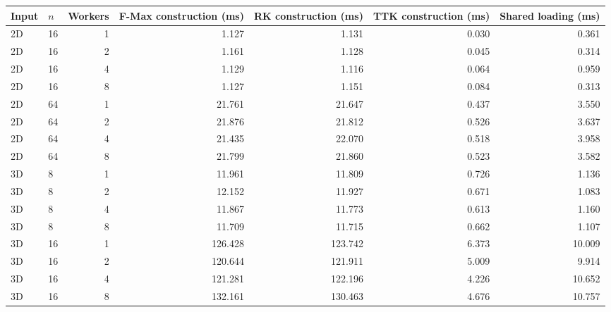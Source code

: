 \begin{tabular}{llrrrrr}
\hline
Input & $n$ & Workers & F-Max construction (ms) & RK construction (ms) & TTK construction (ms) & Shared loading (ms) \\
\hline
2D & 16 & 1 & 1.127 & 1.131 & 0.030 & 0.361 \\
2D & 16 & 2 & 1.161 & 1.128 & 0.045 & 0.314 \\
2D & 16 & 4 & 1.129 & 1.116 & 0.064 & 0.959 \\
2D & 16 & 8 & 1.127 & 1.151 & 0.084 & 0.313 \\
2D & 64 & 1 & 21.761 & 21.647 & 0.437 & 3.550 \\
2D & 64 & 2 & 21.876 & 21.812 & 0.526 & 3.637 \\
2D & 64 & 4 & 21.435 & 22.070 & 0.518 & 3.958 \\
2D & 64 & 8 & 21.799 & 21.860 & 0.523 & 3.582 \\
3D & 8 & 1 & 11.961 & 11.809 & 0.726 & 1.136 \\
3D & 8 & 2 & 12.152 & 11.927 & 0.671 & 1.083 \\
3D & 8 & 4 & 11.867 & 11.773 & 0.613 & 1.160 \\
3D & 8 & 8 & 11.709 & 11.715 & 0.662 & 1.107 \\
3D & 16 & 1 & 126.428 & 123.742 & 6.373 & 10.009 \\
3D & 16 & 2 & 120.644 & 121.911 & 5.009 & 9.914 \\
3D & 16 & 4 & 121.281 & 122.196 & 4.226 & 10.652 \\
3D & 16 & 8 & 132.161 & 130.463 & 4.676 & 10.757 \\
\hline
\end{tabular}
